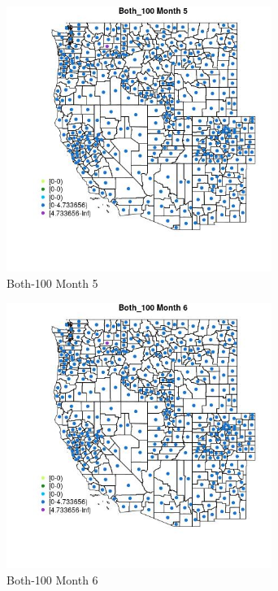 \begin{figure} 
\centering  
\includegraphics[width=0.77\textwidth]{Code_Outputs/df_report_ML_predictors_CountyCentroid_Locations_Dates_2008-01-01to2018-12-31_MapObsMo5Both_100.jpg} 
\caption{\label{fig:df_report_ML_predictors_CountyCentroid_Locations_Dates_2008-01-01to2018-12-31MapObsMo5Both_100}Both-100 Month 5} 
\end{figure} 
 

\begin{figure} 
\centering  
\includegraphics[width=0.77\textwidth]{Code_Outputs/df_report_ML_predictors_CountyCentroid_Locations_Dates_2008-01-01to2018-12-31_MapObsMo6Both_100.jpg} 
\caption{\label{fig:df_report_ML_predictors_CountyCentroid_Locations_Dates_2008-01-01to2018-12-31MapObsMo6Both_100}Both-100 Month 6} 
\end{figure} 
 

